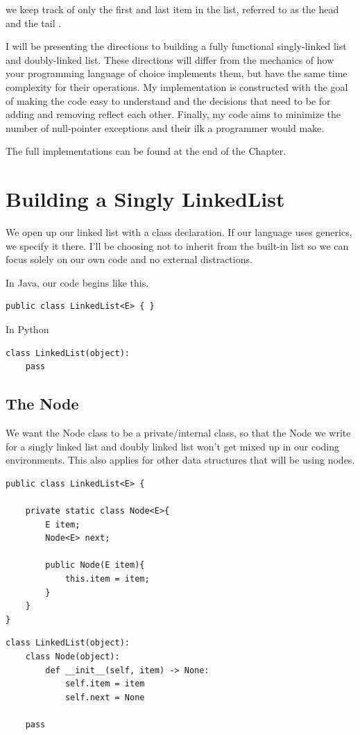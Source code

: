 \documentclass[10pt,a4paper]{book}
\begin{document}
we keep track of only the first and last item in the list, referred to as the head and the tail . 


I will be presenting the directions to building a fully functional  singly-linked list and doubly-linked list.  
These directions will differ from the mechanics of how your programming language of choice implements them, but have the same time complexity for their operations.
My implementation is constructed with the goal of making the code easy to understand and the decisions that need to be for adding and removing reflect each other.
Finally, my code aims to minimize the number of null-pointer exceptions and their ilk a programmer would make.

The full implementations can be found at the end of the Chapter.

\section{Building a Singly LinkedList}
We open up our linked list with a class declaration. 
If our language uses generics, we specify it there.
I'll be choosing not to inherit from the built-in list so we can focus solely on our own code and no external distractions.


In Java, our code begins like this.
\begin{verbatim}
public class LinkedList<E> { }
\end{verbatim}


In Python
\begin{verbatim}
class LinkedList(object):
	pass
\end{verbatim}


\subsection{The Node}
We want the Node class to be a private/internal class, so that the Node we write for a singly linked list and doubly linked list won't get mixed up in our coding environments.
This also applies for other data structures that will be using nodes.

\begin{verbatim}
public class LinkedList<E> { 
	
	private static class Node<E>{
		E item;
		Node<E> next;
		
		public Node(E item){
			this.item = item;
		}
	}
}
\end{verbatim}

\begin{verbatim}
class LinkedList(object):
	class Node(object):
		def __init__(self, item) -> None:
			self.item = item
			self.next = None

	pass
\end{verbatim}
\end{document}
